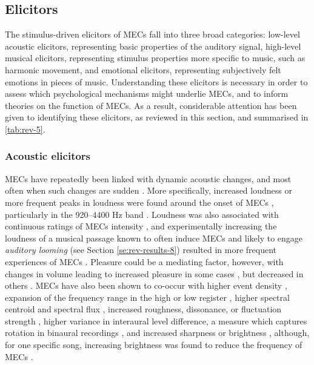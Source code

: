 \subsection{Elicitors}
\label{se:rev-results-6}

The stimulus-driven elicitors of MECs fall into three broad categories: low-level acoustic elicitors, representing basic properties of the auditory signal, high-level musical elicitors, representing stimulus properties more specific to music, such as harmonic movement, and emotional elicitors, representing subjectively felt emotions in pieces of music. Understanding these elicitors is necessary in order to assess which psychological mechanisms might underlie MECs, and to inform theories on the function of MECs. As a result, considerable attention has been given to identifying these elicitors, as reviewed in this section, and summarised in \autoref{tab:rev-5}.

\subsubsection{Acoustic elicitors}

MECs have repeatedly been linked with dynamic acoustic changes, and most often when such changes are sudden \parencite{auricchio2017, guhn2007, nagel2008, polo2017, sloboda1991}. More specifically, increased loudness or more frequent peaks in loudness were found around the onset of MECs \parencite{beier2020, grewe2007, guhn2007, honda2020, nagel2008}, particularly in the 920--4400 Hz band \parencite{nagel2008}. Loudness was also associated with continuous ratings of MECs intensity \parencite{bannister2018}, and experimentally increasing the loudness of a musical passage known to often induce MECs and likely to engage \emph{auditory looming} (see Section \ref{se:rev-results-8}) resulted in more frequent experiences of MECs \parencite{bannister2020b}. Pleasure could be a mediating factor, however, with changes in volume leading to increased pleasure in some cases \parencite{grewe2007}, but decreased in others \parencite{bannister2020b}. MECs have also been shown to co-occur with higher event density \parencite{bannister2018, nagel2008, polo2017}, expansion of the frequency range in the high or low register \parencite{guhn2007, polo2017}, higher spectral centroid and spectral flux \parencite{bannister2018}, increased roughness, dissonance, or fluctuation strength \parencite{bannister2018, beier2020, grewe2007, nagel2008, park2019}, higher variance in interaural level difference, a measure which captures rotation in binaural recordings \parencite{honda2020}, and increased sharpness or brightness \parencite{bannister2018, beier2020, grewe2007, honda2020}, although, for one specific song, increasing brightness was found to reduce the frequency of MECs \parencite{bannister2020b}.

